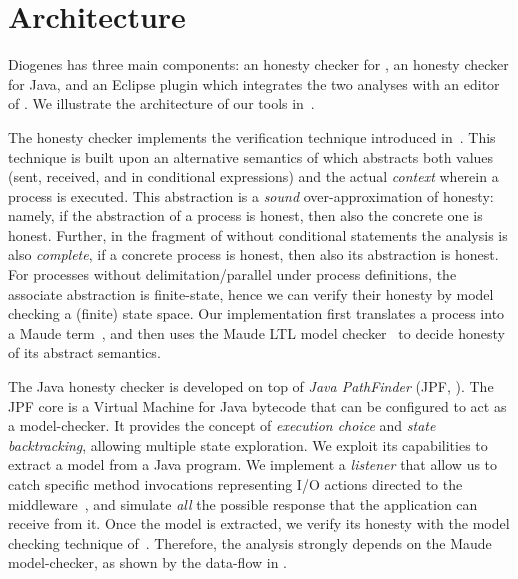 \section{Architecture}

Diogenes has three main components:
an honesty checker for \coco,
an honesty checker for Java,
and an Eclipse plugin which integrates the two analyses
with an editor of \coco.
We illustrate the architecture of our tools in~.

The \coco honesty checker implements the  
verification technique introduced in~\cite{BCPZ15jlamp}.
This technique is built upon an alternative semantics of \coco 
which abstracts both values (sent, received, and in conditional expressions) 
and the actual \emph{context} wherein a process is executed.
This abstraction is a \emph{sound} over-approximation of honesty:
namely, if the abstraction of a process is honest,
then also the concrete one is honest.
Further, in the fragment of \coco without conditional statements
the analysis is also \emph{complete},
\ie if a concrete process is honest, then also its abstraction is honest.
For processes without delimitation/parallel under process definitions,
the associate abstraction is finite-state, 
hence we can verify their honesty by model checking a (finite) state space.
Our implementation 
first translates a \coco process into a Maude term~\cite{Maude01}, 
and then uses the Maude LTL model checker~\cite{Eker02maude}
to decide honesty of its abstract semantics.

The Java honesty checker is developed on top of \emph{Java PathFinder}
(JPF, \cite{lerda2001addressing,visser2003model}).
The JPF core is a Virtual Machine for Java bytecode
that can be configured to act as a model-checker.
It provides the concept of \emph{execution choice}
and \emph{state backtracking}, allowing multiple state exploration.
%
We exploit its capabilities to extract a \coco model
from a Java program. We implement a \emph{listener} that allow us
to catch specific method invocations representing I/O actions
directed to the middleware~\cite{CO2middleware},
and simulate \emph{all} the possible response that 
the application can receive from it.
Once the \coco model is extracted, we verify its honesty
with the model checking technique of~\cite{BCPZ15jlamp}.
Therefore, the analysis strongly depends on the Maude model-checker,
as shown by the data-flow in .

